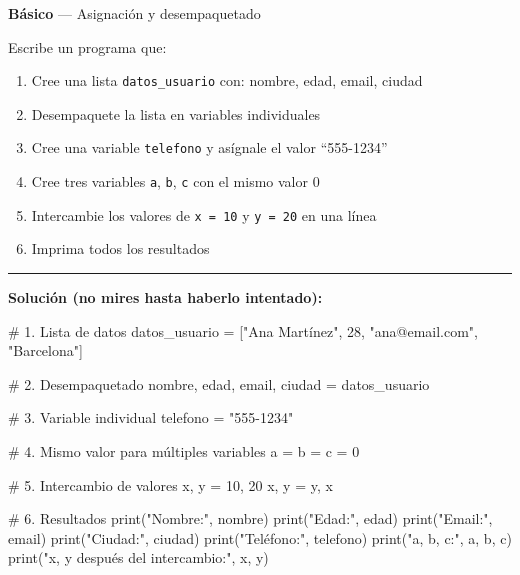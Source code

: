 \documentclass[
  doc,
  floatsintext,
  longtable,
  a4paper,
  nolmodern,
  notxfonts,
  notimes,
  12pt,
  colorlinks=true,linkcolor=blue,citecolor=blue,urlcolor=blue]{apa7}
\newenvironment{Shaded}{\begin{snugshade}}{\end{snugshade}}
\newcommand{\BuiltInTok}[1]{\textcolor[rgb]{0.00,0.23,0.31}{#1}}
\newcommand{\CommentTok}[1]{\textcolor[rgb]{0.37,0.37,0.37}{#1}}
\newcommand{\DecValTok}[1]{\textcolor[rgb]{0.68,0.00,0.00}{#1}}
\newcommand{\NormalTok}[1]{\textcolor[rgb]{0.00,0.23,0.31}{#1}}
\newcommand{\OperatorTok}[1]{\textcolor[rgb]{0.37,0.37,0.37}{#1}}
\newcommand{\StringTok}[1]{\textcolor[rgb]{0.13,0.47,0.30}{#1}}
\providecommand{\tightlist}{%
  \setlength{\itemsep}{0pt}\setlength{\parskip}{0pt}}
\begin{document}
\textbf{Básico} --- Asignación y desempaquetado

Escribe un programa que:

\begin{enumerate}
\def\labelenumi{\arabic{enumi}.}
\tightlist
\item
  Cree una lista \texttt{datos\_usuario} con: nombre, edad, email,
  ciudad
\item
  Desempaquete la lista en variables individuales
\item
  Cree una variable \texttt{telefono} y asígnale el valor ``555-1234''
\item
  Cree tres variables \texttt{a}, \texttt{b}, \texttt{c} con el mismo
  valor 0
\item
  Intercambie los valores de \texttt{x\ =\ 10} y \texttt{y\ =\ 20} en
  una línea
\item
  Imprima todos los resultados
\end{enumerate}

\begin{center}\rule{0.5\linewidth}{0.5pt}\end{center}

\textbf{Solución (no mires hasta haberlo intentado):}

\begin{Shaded}
\begin{Highlighting}[]
\CommentTok{\# 1. Lista de datos}
\NormalTok{datos\_usuario }\OperatorTok{=}\NormalTok{ [}\StringTok{"Ana Martínez"}\NormalTok{, }\DecValTok{28}\NormalTok{, }\StringTok{"ana@email.com"}\NormalTok{, }\StringTok{"Barcelona"}\NormalTok{]}

\CommentTok{\# 2. Desempaquetado}
\NormalTok{nombre, edad, email, ciudad }\OperatorTok{=}\NormalTok{ datos\_usuario}

\CommentTok{\# 3. Variable individual}
\NormalTok{telefono }\OperatorTok{=} \StringTok{"555{-}1234"}

\CommentTok{\# 4. Mismo valor para múltiples variables}
\NormalTok{a }\OperatorTok{=}\NormalTok{ b }\OperatorTok{=}\NormalTok{ c }\OperatorTok{=} \DecValTok{0}

\CommentTok{\# 5. Intercambio de valores}
\NormalTok{x, y }\OperatorTok{=} \DecValTok{10}\NormalTok{, }\DecValTok{20}
\NormalTok{x, y }\OperatorTok{=}\NormalTok{ y, x}

\CommentTok{\# 6. Resultados}
\BuiltInTok{print}\NormalTok{(}\StringTok{"Nombre:"}\NormalTok{, nombre)}
\BuiltInTok{print}\NormalTok{(}\StringTok{"Edad:"}\NormalTok{, edad)}
\BuiltInTok{print}\NormalTok{(}\StringTok{"Email:"}\NormalTok{, email)}
\BuiltInTok{print}\NormalTok{(}\StringTok{"Ciudad:"}\NormalTok{, ciudad)}
\BuiltInTok{print}\NormalTok{(}\StringTok{"Teléfono:"}\NormalTok{, telefono)}
\BuiltInTok{print}\NormalTok{(}\StringTok{"a, b, c:"}\NormalTok{, a, b, c)}
\BuiltInTok{print}\NormalTok{(}\StringTok{"x, y después del intercambio:"}\NormalTok{, x, y)}
\end{Highlighting}
\end{Shaded}
\end{document}

